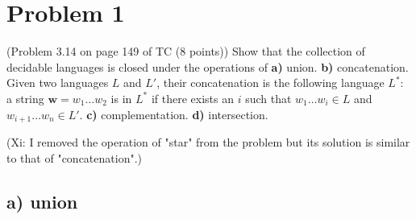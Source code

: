\documentclass[twoside,11pt]{homework}
\date{\today} %
\begin{document}
\maketitle

\section*{Problem 1}
(Problem 3.14 on page 149 of TC (8 points))
Show that the collection of decidable languages is closed under the operations
of
\textbf{a)} union.
\textbf{b)} concatenation. Given two languages $L$ and $L'$, their
concatenation is the following language $L^*$: a string $\mathbf{w} = w_1 \dots
w_2$ is in $L^*$ if there exists an $i$ such that $w_1 \dots w_i \in L$ and
$w_{i+1}\dots w_n \in L'$.
\textbf{c)} complementation.
\textbf{d)} intersection.

(Xi: I removed the operation of "star" from the problem but its solution is
similar to that of "concatenation".)

\subsection*{a) union}
\end{document}
